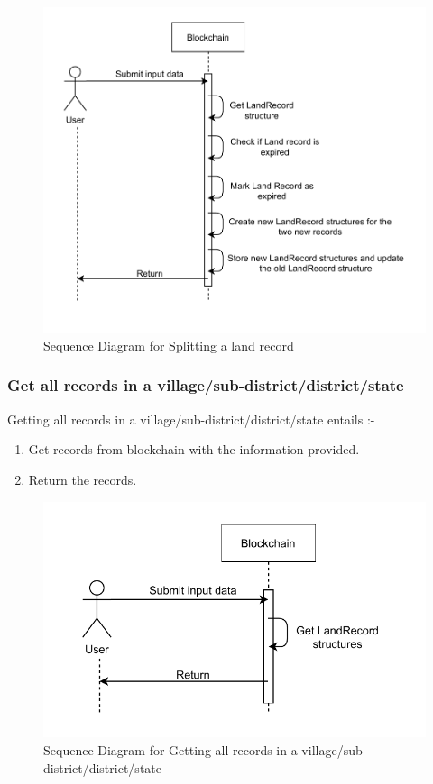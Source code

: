 \documentclass{article}
\begin{document}
        \begin{figure}[htbp]
            \includegraphics[scale=0.25]{blockchain_seq_split_land}
            \centering
            \caption{Sequence Diagram for Splitting a land record}
        \end{figure}
        
    \subsubsection{Get all records in a village/sub-district/district/state}
        Getting all records in a village/sub-district/district/state entails :-
        \begin{enumerate}
            \item Get records from blockchain with the information provided.
            \item Return the records.
        \end{enumerate}

        \begin{figure}[htbp]
            \includegraphics[scale=0.25]{blockchain_seq_get_records}
            \centering
            \caption{Sequence Diagram for Getting all records in a village/sub-district/district/state}
        \end{figure}
\end{document}
